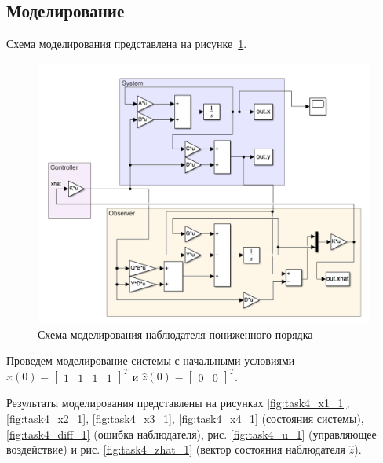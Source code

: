 \subsection{Моделирование}
Схема моделирования представлена на рисунке~\ref{fig:task4_sim}.
\begin{figure}[ht!]
    \centering
    \includegraphics[width=\textwidth]{media/scheme4.png}
    \caption{Схема моделирования наблюдателя пониженного порядка}
    \label{fig:task4_sim}
\end{figure}

Проведем моделирование системы с начальными условиями $x(0) = \begin{bmatrix} 1 & 1 & 1 & 1 \end{bmatrix}^T$ и $\hat{z}(0) = \begin{bmatrix} 0 & 0 \end{bmatrix}^T$.

Результаты моделирования представлены на рисунках \ref{fig:task4_x1_1}, \ref{fig:task4_x2_1}, \ref{fig:task4_x3_1}, \ref{fig:task4_x4_1} (состояния системы), \ref{fig:task4_diff_1} (ошибка наблюдателя), 
рис. \ref{fig:task4_u_1} (управляющее воздействие) и рис. \ref{fig:task4_zhat_1} (вектор состояния наблюдателя $\hat{z}$).

